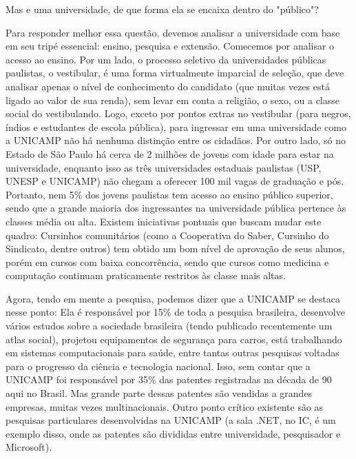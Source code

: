 \documentclass[a4paper,10pt, twocolumn]{article}
\begin{document}
Mas e uma universidade, de que forma ela se encaixa dentro do "público"?

Para responder melhor essa questão, devemos analisar a universidade com base em
seu tripé essencial: ensino, pesquisa e extensão. Comecemos por analisar
o acesso ao ensino. Por um lado, o processo seletivo da universidades públicas
paulistas, o vestibular, é uma forma virtualmente imparcial de seleção, que deve
analisar apenas o nível de conhecimento do candidato (que muitas vezes está
ligado ao valor de sua renda), sem levar em conta a religião, o sexo, ou
a classe social do vestibulando. Logo, exceto por pontos extras no vestibular
(para negros, índios e estudantes de escola pública), para ingressar em uma
universidade como a UNICAMP não há nenhuma distinção entre os cidadãos. Por
outro lado, só no Estado de São Paulo há cerca de 2 milhões de jovens com idade
para estar na universidade, enquanto isso as três universidades estaduais
paulistas (USP, UNESP e UNICAMP) não chegam a oferecer 100 mil vagas de
graduação e pós. Portanto, nem 5\% dos jovens paulistas tem acesso ao ensino
público superior, sendo que a grande maioria dos ingressantes na universidade
pública pertence às classes média ou alta. Existem iniciativas pontuais que
buscam mudar este quadro: Cursinhos comunitários (como a Cooperativa do Saber,
Cursinho do Sindicato, dentre outros) tem obtido um bom nível de aprovação de
seus alunos, porém em cursos com baixa concorrência, sendo que cursos como
medicina e computação continuam praticamente restritos às classe mais altas.

Agora, tendo em mente a pesquisa, podemos dizer que a UNICAMP se destaca nesse
ponto: Ela é responsável por 15\% de toda a pesquisa brasileira, desenvolve
vários estudos sobre a sociedade brasileira (tendo publicado recentemente um
atlas social), projetou equipamentos de segurança para carros, está trabalhando
em sistemas computacionais para saúde, entre tantas outras pesquisas voltadas
para o progresso da ciência e tecnologia nacional. Isso, sem contar que
a UNICAMP foi responsável por 35\% das patentes registradas na década de 90 aqui
no Brasil. Mas grande parte dessas patentes são vendidas a grandes empresas,
muitas vezes multinacionais. Outro ponto crítico existente são as pesquisas
particulares desenvolvidas na UNICAMP (a sala .NET, no IC, é um exemplo disso,
onde as patentes são divididas entre universidade, pesquisador e Microsoft).
\end{document}
